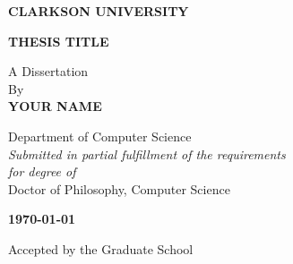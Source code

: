 
\begin{titlepage}
		\begin{center}
			\Large
			\textbf{CLARKSON UNIVERSITY}

			\LARGE
			\vspace{1.5cm}
			\textbf{THESIS TITLE}
			\vspace{1.5cm}

			\large
			\doublespacing
			A Dissertation\\
			By\\

			\vspace{0.5cm}
			\textbf{YOUR NAME}
			\vspace{0.75cm}

			\large
			Department of Computer Science\\
			\textit{Submitted in partial fulfillment of the requirements\\
			for degree of\\}
			Doctor of Philosophy, Computer Science

			\vspace{0.8cm}
			\textbf{\today}

			\vfill
			\normalsize
			\begin{flushright}
				Accepted by the Graduate School
			\end{flushright}

			\hfill\makebox[1in]{\hrulefill,} \makebox[2in]{\hrulefill}
			\par\hfill{} 
		\end{center}
\end{titlepage}